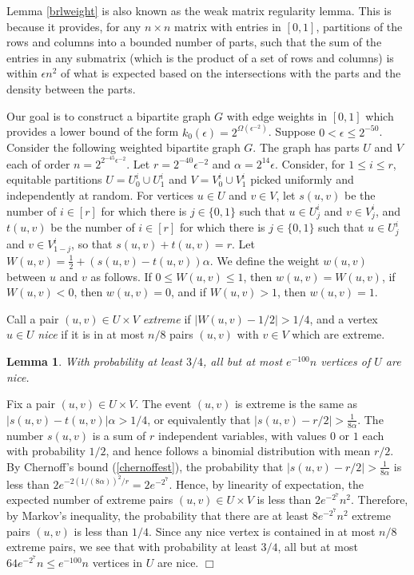 \documentclass[11pt]{article}
\newtheorem{lemma}{Lemma}[section]
\newenvironment{proof}
      {\medskip\noindent{\bf Proof:}\hspace{1mm}}
      {\hfill$\Box$\medskip}
\begin{document}
Lemma \ref{brlweight} is also known as the weak matrix regularity lemma. This
is because it provides, for any $n \times n$ matrix with entries in $[0,1]$,
partitions of the rows and columns into a bounded number of parts, such that
the sum of the entries in any submatrix (which is the product of a set of rows
and columns) is within $\epsilon n^2$ of what is expected based on the
intersections with the parts and the density between the parts.

Our goal is to construct a bipartite graph $G$ with edge weights in $[0,1]$
which provides a lower bound of the form $k_0(\epsilon) =
2^{\Omega(\epsilon^{-2})}$. Suppose $0<\epsilon \leq 2^{-50}$. Consider the
following weighted bipartite graph $G$. The graph has parts $U$ and $V$ each of
order $n=2^{2^{-45}\epsilon^{-2}}$. Let $r=2^{-40}\epsilon^{-2}$ and
$\alpha=2^{14}\epsilon$. Consider, for $1 \leq i \leq r$, equitable partitions
$U=U^i_0 \cup U^i_1$ and $V=V^i_0 \cup V^i_1$ picked uniformly and
independently at random. For vertices $u \in U$ and $v \in V$, let $s(u,v)$ be
the number of $i \in [r]$ for which there is $j \in \{0,1\}$ such that $u \in
U^i_j$ and $v \in V^i_j$, and $t(u,v)$ be the number of $i \in [r]$ for which
there is $j \in \{0,1\}$ such that $u \in U^i_j$ and $v \in V^i_{1-j}$, so that
$s(u,v)+t(u,v)=r$. Let $W(u,v)=\frac{1}{2}+(s(u,v)-t(u,v))\alpha$. We define
the weight $w(u,v)$ between $u$ and $v$ as follows. If $0 \leq W(u,v) \leq 1$,
then $w(u,v)=W(u,v)$, if $W(u,v)<0$, then $w(u,v)=0$, and if $W(u,v)>1$, then
$w(u,v)=1$.

Call a pair $(u,v) \in U \times V$ {\it extreme} if $|W(u,v)-1/2| >1/4$, and a
vertex $u \in U$ {\it nice} if it is in at most $n/8$ pairs $(u,v)$ with $v \in
V$ which are extreme.

\begin{lemma}\label{lem34a}
With probability at least $3/4$, all but at most $e^{-100}n$ vertices of $U$
are nice.
\end{lemma}
\begin{proof}
Fix a pair $(u,v) \in U \times V$. The event $(u,v)$ is extreme is the same as
$|s(u,v)-t(u,v)|\alpha>1/4$, or equivalently that
$|s(u,v)-r/2|>\frac{1}{8\alpha}$. The number $s(u,v)$ is a sum of $r$
independent variables, with values $0$ or $1$ each with probability $1/2$, and
hence follows a binomial distribution with mean $r/2$. By Chernoff's bound
(\ref{chernoffest}), the probability that $|s(u,v)-r/2| > \frac{1}{8\alpha}$ is
less than $2e^{-2(1/(8\alpha))^2/r}=2e^{-2^{7}}$. Hence, by linearity of
expectation, the expected number of extreme pairs $(u,v) \in U \times V$ is
less than $2e^{-2^{7}}n^2$. Therefore, by Markov's inequality, the probability
that there are at least $8e^{-2^{7}}n^2$ extreme pairs $(u,v)$ is less than
$1/4$. Since any nice vertex is contained in at most $n/8$ extreme pairs, we
see that with probability at least $3/4$, all but at most $64 e^{-2^7} n \leq
e^{-100} n$ vertices in $U$ are nice.
\end{proof}
\end{document}
